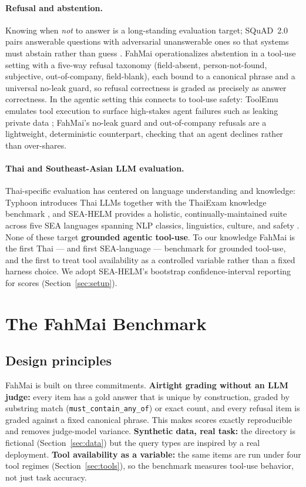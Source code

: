 \documentclass[11pt]{article}
\begin{document}
\paragraph{Refusal and abstention.} Knowing when \emph{not} to answer is a long-standing evaluation
target; SQuAD~2.0 pairs answerable questions with adversarial unanswerable ones so that systems must
abstain rather than guess \citep{rajpurkar2018squad}. FahMai operationalizes abstention in a tool-use
setting with a five-way refusal taxonomy (field-absent, person-not-found, subjective, out-of-company,
field-blank), each bound to a canonical phrase and a universal no-leak guard, so refusal correctness is
graded as precisely as answer correctness. In the agentic setting this connects to tool-use safety:
ToolEmu emulates tool execution to surface high-stakes agent failures such as leaking private data
\citep{ruan2023toolemu}; FahMai's no-leak guard and out-of-company refusals are a lightweight,
deterministic counterpart, checking that an agent declines rather than over-shares.

\paragraph{Thai and Southeast-Asian LLM evaluation.} Thai-specific evaluation has centered on language
understanding and knowledge: Typhoon introduces Thai LLMs together with the ThaiExam knowledge
benchmark \citep{pipatanakul2023typhoon}, and SEA-HELM provides a holistic, continually-maintained
suite across five SEA languages spanning NLP classics, linguistics, culture, and safety
\citep{susanto2025seahelm}. None of these target \textbf{grounded agentic tool-use}. To our knowledge
FahMai is the first Thai --- and first SEA-language --- benchmark for grounded tool-use, and the first
to treat tool availability as a controlled variable rather than a fixed harness choice. We adopt
SEA-HELM's bootstrap confidence-interval reporting for scores (Section~\ref{sec:setup}).

\section{The FahMai Benchmark}

\subsection{Design principles}

FahMai is built on three commitments. \textbf{Airtight grading without an LLM judge:} every item has a
gold answer that is unique by construction, graded by substring match (\texttt{must\_contain\_any\_of})
or exact count, and every refusal item is graded against a fixed canonical phrase. This makes scores
exactly reproducible and removes judge-model variance. \textbf{Synthetic data, real task:} the
directory is fictional (Section~\ref{sec:data}) but the query types are inspired by a real deployment.
\textbf{Tool availability as a variable:} the same items are run under four tool regimes
(Section~\ref{sec:tools}), so the benchmark measures tool-use behavior, not just task accuracy.
\end{document}
